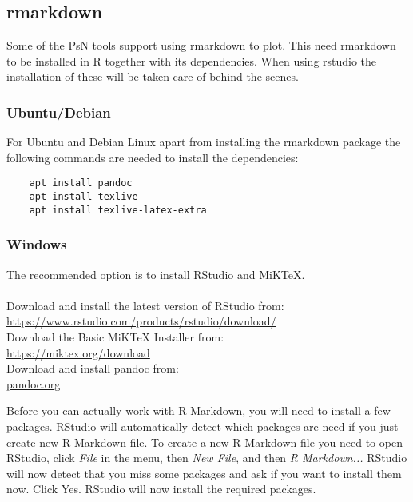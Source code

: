 \subsection{rmarkdown}

Some of the PsN tools support using rmarkdown to plot. This need rmarkdown to be installed in R together with its dependencies. When using rstudio the installation of these will be taken care of behind the scenes.

\subsubsection{Ubuntu/Debian}

For Ubuntu and Debian Linux apart from installing the rmarkdown package the following commands are needed to install the dependencies:

\begin{verbatim}
    apt install pandoc
    apt install texlive
    apt install texlive-latex-extra
\end{verbatim}

\subsubsection{Windows}

The recommended option is to install RStudio and MiKTeX.\\ \\
Download and install the latest version of RStudio from: \\
\url{https://www.rstudio.com/products/rstudio/download/} \\
Download the Basic MiKTeX Installer from: \\
\url{https://miktex.org/download} \\
Download and install pandoc from: \\
\url{pandoc.org}

Before you can actually work with R Markdown, you will need to install a few packages. RStudio will automatically detect which packages are need if you just create new R Markdown file. To create a new R Markdown file you need to open RStudio, click {\it File} in the menu, then {\it New File}, and then {\it R Markdown...} RStudio will now detect that you miss some packages and ask if you want to install them now. Click Yes. RStudio will now install the required packages.


